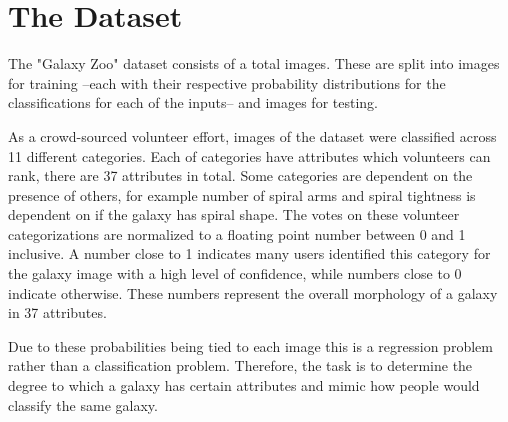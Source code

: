 \section{The Dataset}

The "Galaxy Zoo" dataset consists of a total  images. These are split into  images for training --each with their respective probability distributions for the classifications for each of the inputs-- and  images for testing.

As a crowd-sourced volunteer effort, images of the dataset were classified across 11 different categories. Each of categories have attributes which volunteers can rank, there are 37 attributes in total. Some categories are dependent on the presence of others, for example number of spiral arms and spiral tightness is dependent on if the galaxy has spiral shape. The votes on these volunteer categorizations are normalized to a floating point number between 0 and 1 inclusive. A number close to 1 indicates many users identified this category for the galaxy image with a high level of confidence, while numbers close to 0 indicate otherwise. These numbers represent the overall morphology of a galaxy in 37 attributes.

Due to these probabilities being tied to each image this is a regression problem rather than a classification problem. Therefore, the task is to determine the degree to which a galaxy has certain attributes and mimic how people would classify the same galaxy.
